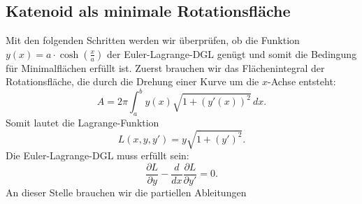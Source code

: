\subsection{Katenoid als minimale Rotationsfläche
	\label{Das Katenoid:subsection:Katenoid als minimale Rotationsfläche}}
Mit den folgenden Schritten werden wir überprüfen, ob die Funktion  \( y(x) = a \cdot \cosh \left( \frac{x}{a} \right) \) der Euler-Lagrange-DGL genügt und somit die Bedingung für Minimalflächen erfüllt ist.
Zuerst brauchen wir das Flächenintegral der Rotationsfläche, die durch die Drehung einer Kurve um die $x$-Achse entsteht:
\begin{equation}
	A = 2\pi \int_{a}^{b} y(x) \sqrt{1 + (y'(x))^2} \,dx.
\end{equation}
Somit lautet die Lagrange-Funktion 
\begin{equation}
	L(x, y, y') = y \sqrt{1 + (y')^2}.	
\end{equation}
Die Euler-Lagrange-DGL muss erfüllt sein: 
\begin{equation}
	\frac{\partial L}{\partial y} - \frac{d}{dx}  \frac{\partial L}{\partial y'} = 0.
\end{equation}
An dieser Stelle brauchen wir die partiellen Ableitungen

